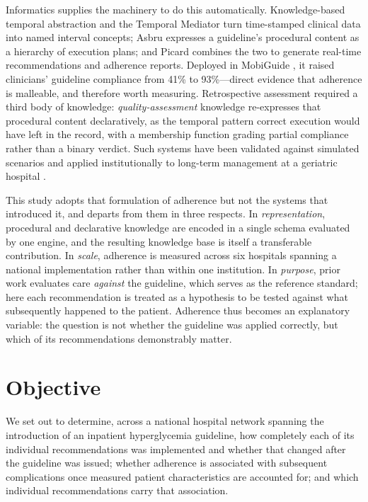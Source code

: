 Informatics supplies the machinery to do this automatically. Knowledge-based
temporal abstraction and the Temporal Mediator \citep{shahar1997framework} turn
time-stamped clinical data into named interval concepts; Asbru
\citep{shahar1997asbru, shahar1998asgaard} expresses a guideline's procedural
content as a hierarchy of execution plans; and Picard
\citep{shalom2016architecture} combines the two to generate real-time
recommendations and adherence reports. Deployed in MobiGuide
\citep{peleg2022mobiguide}, it raised clinicians' guideline compliance from
41\% to 93\%---direct evidence that adherence is malleable, and therefore worth
measuring. Retrospective assessment required a third body of knowledge:
\emph{quality-assessment} knowledge \citep{ben2024supporting} re-expresses that
procedural content declaratively, as the temporal pattern correct execution
would have left in the record, with a membership function grading partial
compliance rather than a binary verdict. Such systems have been validated
against simulated scenarios \citep{shalom2015multiple} and applied
institutionally to long-term management at a geriatric hospital
\citep{shalom2024implementation}.

This study adopts that formulation of adherence but not the systems that
introduced it, and departs from them in three respects. In
\emph{representation}, procedural and declarative knowledge are encoded in a
single schema evaluated by one engine, and the resulting knowledge base is
itself a transferable contribution. In \emph{scale}, adherence is measured
across six hospitals spanning a national implementation rather than within one
institution. In \emph{purpose}, prior work evaluates care \emph{against} the
guideline, which serves as the reference standard; here each recommendation is
treated as a hypothesis to be tested against what subsequently happened to the
patient. Adherence thus becomes an explanatory variable: the question is not
whether the guideline was applied correctly, but which of its recommendations
demonstrably matter.

\section{Objective}
\label{sec:objective}

We set out to determine, across a national hospital network spanning the
introduction of an inpatient hyperglycemia guideline, how completely each of
its individual recommendations was implemented and whether that changed after
the guideline was issued; whether adherence is associated with subsequent
complications once measured patient characteristics are accounted for; and
which individual recommendations carry that association.

